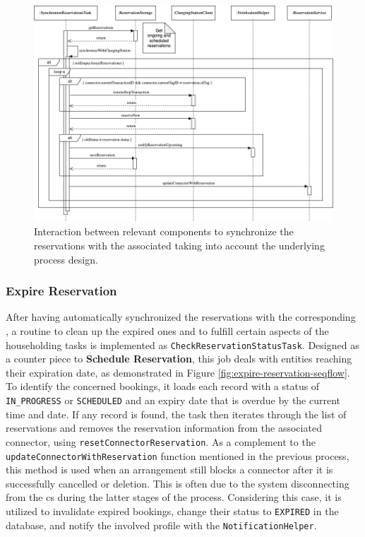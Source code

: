 \begin{figure}[h]
    \centering
    \includegraphics[scale=0.4]{resources/images/main/6_implementation/processes/scheduler/SynchronizeReservation.png}
    \caption{Interaction between relevant components to synchronize the reservations with the associated  taking into account the underlying process design.}
    \label{fig:schedule-reservation-seqflow}
\end{figure}

\newpage

\subsubsection{Expire Reservation}
\label{ch:Implementation:sec:Reservation System:ssec:Scheduling Capabilities:sssec:Expire Reservation}

After having automatically synchronized the reservations with the corresponding , a routine to clean up the expired ones and to fulfill certain aspects of the householding tasks is implemented as \texttt{CheckReservationStatusTask}.
Designed as a counter piece to \textbf{Schedule Reservation}, this job deals with entities reaching their expiration date, as demonstrated in Figure \ref{fig:expire-reservation-seqflow}.
To identify the concerned bookings, it loads each record with a status of \texttt{IN\_PROGRESS} or \texttt{SCHEDULED} and an expiry date that is overdue by the current time and date.
If any record is found, the task then iterates through the list of reservations and removes the reservation information from the associated connector, using \texttt{resetConnectorReservation}. 
As a complement to the \texttt{updateConnectorWithReservation} function mentioned in the previous process, this method is used when an arrangement still blocks a connector after it is successfully cancelled or deletion. This is often due to the system disconnecting from the \acrshort{cs} during the latter stages of the process.
Considering this case, it is utilized to invalidate expired bookings, change their status to \texttt{EXPIRED} in the database, and notify the involved profile with the \texttt{NotificationHelper}.

